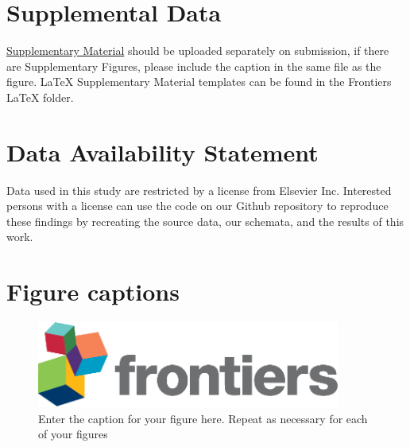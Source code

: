 \documentclass[utf8]{frontiersSCNS}
\begin{document}
\section*{Supplemental Data}
 \href{http://home.frontiersin.org/about/author-guidelines#SupplementaryMaterial}{Supplementary Material} should be uploaded separately on submission, if there are Supplementary Figures, please include the caption in the same file as the figure. LaTeX Supplementary Material templates can be found in the Frontiers LaTeX folder.

\section*{Data Availability Statement}
Data used in this study are restricted by a license from Elsevier Inc. Interested persons with a license can use the code on our Github repository to reproduce these findings by recreating the source data, our schemata, and the results of this work.

 


\section*{Figure captions}


\begin{figure}[h!]
\begin{center}
\includegraphics[width=10cm]{logo1}%
\end{center}
\caption{ Enter the caption for your figure here.  Repeat as  necessary for each of your figures}\label{fig:1}
\end{figure}
\end{document}

